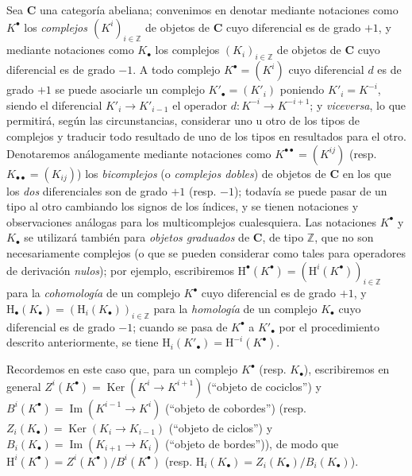 \begin{env}[11.2.1]
\label{0.11.2.1}
\label{0.11.2.1-fr}
Sea $\boldsymbol{C}$ una categoría abeliana; convenimos en denotar mediante notaciones como $K^\bullet$ los \emph{complejos $(K^i)_{i\in\mathbb Z}$} de objetos de $\boldsymbol{C}$ cuyo diferencial es de grado $+1$, y mediante notaciones como $K_\bullet$ los complejos $(K_i)_{i\in\mathbb Z}$ de objetos de $\boldsymbol{C}$ cuyo diferencial es de grado $-1$.
A todo complejo $K^\bullet=(K^i)$ cuyo diferencial $d$ es de grado $+1$ se puede asociarle un complejo $K'_\bullet=(K'_i)$ poniendo $K'_i=K^{-i}$, siendo el diferencial $K'_i\to K'_{i-1}$ el operador $d:K^{-i}\to K^{-i+1}$; y \emph{viceversa}, lo que permitirá, según las circunstancias, considerar uno u otro de los tipos de complejos y traducir todo resultado de uno de los tipos en resultados para el otro.
Denotaremos análogamente mediante notaciones como $K^{\bullet\bullet}=(K^{ij})$ (resp. $K_{\bullet\bullet}=(K_{ij})$) los \emph{bicomplejos} (o \emph{complejos dobles}) de objetos de $\boldsymbol{C}$ en los que los \emph{dos} diferenciales son de grado $+1$ (resp. $-1$); todavía se puede pasar de un tipo al otro cambiando los signos de los índices, y se tienen notaciones y observaciones análogas para los multicomplejos cualesquiera.
Las notaciones $K^\bullet$ y $K_\bullet$ se utilizará también para \emph{objetos graduados} de $\boldsymbol{C}$, de tipo $\mathbb Z$, que no son necesariamente complejos (o que se pueden considerar como tales para operadores de derivación \emph{nulos}); por ejemplo, escribiremos
$\mathrm H^\bullet(K^\bullet)=(\mathrm H^i(K^\bullet))_{i\in\mathbb Z}$ para la \emph{cohomología} de un complejo $K^\bullet$ cuyo diferencial es de grado $+1$, y $\mathrm H_\bullet(K_\bullet)=(\mathrm H_i(K_\bullet))_{i\in\mathbb Z}$ para la \emph{homología} de un complejo $K_\bullet$ cuyo diferencial es de grado $-1$; cuando se pasa de $K^\bullet$ a $K'_\bullet$ por el procedimiento descrito anteriormente, se tiene $\mathrm H_i(K'_\bullet)=\mathrm H^{-i}(K^\bullet)$.

Recordemos en este caso que, para un complejo $K^\bullet$ (resp. $K_\bullet$), escribiremos en general $Z^i(K^\bullet)=\operatorname{Ker}(K^i\to K^{i+1})$ (``objeto de cociclos'') y $B^i(K^\bullet)=\operatorname{Im}(K^{i-1}\to K^i)$ (``objeto de cobordes'') (resp. $Z_i(K_\bullet)=\operatorname{Ker}(K_i\to K_{i-1})$ (``objeto de ciclos'') y $B_i(K_\bullet)=\operatorname{Im}(K_{i+1}\to K_i)$ (``objeto de bordes'')), de modo que $\mathrm H^i(K^\bullet)=Z^i(K^\bullet)/B^i(K^\bullet)$ (resp. $\mathrm H_i(K_\bullet)=Z_i(K_\bullet)/B_i(K_\bullet)$).


\end{env}
